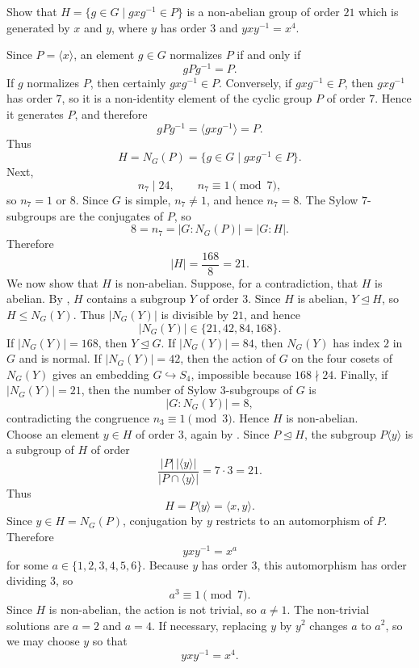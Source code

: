 \documentclass[../Odyssey_Project.tex]{subfiles}
\begin{document}
\begin{exercise}
\label{ex:7.13}
Show that $H = \{g \in G \mid gxg^{-1} \in P\}$ is a non-abelian group of order $21$ which is generated by $x$ and $y$, where $y$ has order $3$ and $yxy^{-1} = x^4$.
\end{exercise}
\begin{solution}
    Since $P=\langle x\rangle$, an element $g\in G$ normalizes $P$ if and only if
    \[
        gPg^{-1}=P.
    \]
    If $g$ normalizes $P$, then certainly $gxg^{-1}\in P$. Conversely, if $gxg^{-1}\in P$, then $gxg^{-1}$ has order $7$, so it is a non-identity element of the cyclic group $P$ of order $7$. Hence it generates $P$, and therefore
    \[
        gPg^{-1}=\langle gxg^{-1}\rangle=P.
    \]
    Thus
    \[
        H=N_G(P)=\{g\in G\mid gxg^{-1}\in P\}.
    \]
    Next,
    \[
        n_7\mid 24,\qquad n_7\equiv 1\pmod 7,
    \]
    so $n_7=1$ or $8$. Since $G$ is simple, $n_7\neq 1$, and hence $n_7=8$. The Sylow $7$-subgroups are the conjugates of $P$, so
    \[
        8=n_7=|G:N_G(P)|=|G:H|.
    \]
    Therefore
    \[
        |H|=\frac{168}{8}=21.
    \]
    We now show that $H$ is non-abelian. Suppose, for a contradiction, that $H$ is abelian. By , $H$ contains a subgroup $Y$ of order $3$. Since $H$ is abelian, $Y\trianglelefteq H$, so $H\leq N_G(Y)$. Thus $|N_G(Y)|$ is divisible by $21$, and hence
    \[
        |N_G(Y)|\in\{21,42,84,168\}.
    \]
    If $|N_G(Y)|=168$, then $Y\trianglelefteq G$. If $|N_G(Y)|=84$, then $N_G(Y)$ has index $2$ in $G$ and is normal. If $|N_G(Y)|=42$, then the action of $G$ on the four cosets of $N_G(Y)$ gives an embedding $G\hookrightarrow S_4$, impossible because $168\nmid 24$. Finally, if $|N_G(Y)|=21$, then the number of Sylow $3$-subgroups of $G$ is
    \[
        |G:N_G(Y)|=8,
    \]
    contradicting the congruence $n_3\equiv 1\pmod 3$. Hence $H$ is non-abelian.\\
    Choose an element $y\in H$ of order $3$, again by . Since $P\trianglelefteq H$, the subgroup $P\langle y\rangle$ is a subgroup of $H$ of order
    \[
        \frac{|P|\,|\langle y\rangle|}{|P\cap \langle y\rangle|}=7\cdot 3=21.
    \]
    Thus
    \[
        H=P\langle y\rangle=\langle x,y\rangle.
    \]
    Since $y\in H=N_G(P)$, conjugation by $y$ restricts to an automorphism of $P$. Therefore
    \[
        yxy^{-1}=x^a
    \]
    for some $a\in\{1,2,3,4,5,6\}$. Because $y$ has order $3$, this automorphism has order dividing $3$, so
    \[
        a^3\equiv 1\pmod 7.
    \]
    Since $H$ is non-abelian, the action is not trivial, so $a\neq 1$. The non-trivial solutions are $a=2$ and $a=4$. If necessary, replacing $y$ by $y^2$ changes $a$ to $a^2$, so we may choose $y$ so that
    \[
        yxy^{-1}=x^4.
    \]
\end{solution}
\end{document}
